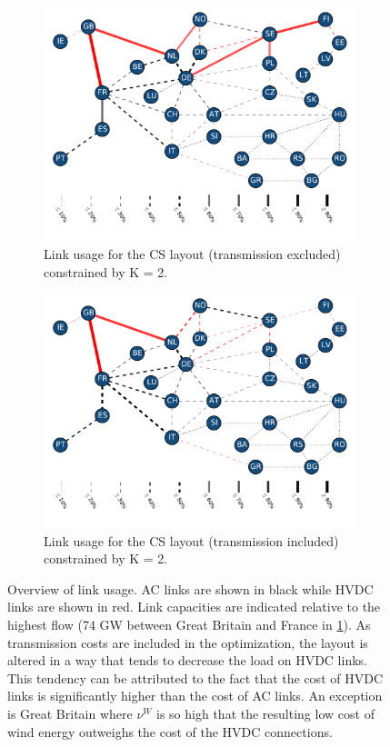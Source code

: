 \documentclass[a4paper, 5p, sort&compress]{elsarticle}%
\begin{document}
\begin{figure}[p]
  \centering
  \begin{subfigure}{2\columnwidth}
    \includegraphics[width = 0.75 \columnwidth, center]{VE50cuckooK=2@defaultLINKS}
    \caption{Link usage for the CS layout (transmission excluded)
      constrained by K = 2.}
    \label{fig:linksNoTrans}    
  \end{subfigure}
  \begin{subfigure}{2\columnwidth}
    \includegraphics[width = 0.75 \columnwidth, center]{VE50cuckooK=2@TRANS10kLINKS}
    \caption{Link usage for the CS layout (transmission included)
      constrained by K = 2.}
    \label{fig:linksTrans}    
  \end{subfigure}
  \caption{Overview of link usage. AC links are shown in black while
    HVDC links are shown in red. Link capacities are indicated
    relative to the highest flow (74 GW between Great Britain and
    France in \cref{fig:linksNoTrans}). As transmission costs are included in
    the optimization, the layout is altered in a way that tends to
    decrease the load on HVDC links. This tendency can be attributed
    to the fact that the cost of HVDC links is significantly higher
    than the cost of AC links. An exception is Great Britain where
    $\nu^{W}$ is so high that the resulting low cost of wind energy
    outweighs the cost of the HVDC connections.}
  \label{fig:links}
\end{figure}
\end{document}
